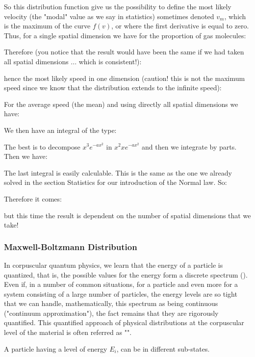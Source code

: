 	So this distribution function give us the possibility to define the most likely velocity (the "modal" value as we say in statistics) sometimes denoted $v_m$, which is the maximum of the curve $f (v)$, or where the first derivative is equal to zero. Thus, for a single spatial dimension we have for the proportion of gas molecules:
	
	Therefore (you notice that the result would have been the same if we had taken all spatial dimensions ... which is consistent!):
	
	hence the most likely speed in one dimension (caution! this is not the maximum speed since we know that the distribution extends to the infinite speed):
	
	For the average speed (the mean) and using directly all spatial dimensions we have:
	
	We then have an integral of the type:
	
	The best is to decompose $x^3e^{-ax^2}$ in $x^2xe^{-ax^2}$ and then we integrate by parts. Then we have:
	
	The last integral is easily calculable. This is the same as the one we already solved in the section Statistics for our introduction of the Normal law. So:
	
	Therefore it comes:
	
	but this time the result is dependent on the number of spatial dimensions that we take!
	
	\subsubsection{Maxwell-Boltzmann Distribution}
	In corpuscular quantum physics, we learn that the energy of a particle is quantized, that is, the possible values for the energy form a discrete spectrum (). Even if, in a number of common situations, for a particle and even more for a system consisting of a large number of particles, the energy levels are so tight that we can handle, mathematically, this spectrum as being continuous ("continuum approximation"), the fact remains that they are rigorously quantified. This quantified approach of physical distributions at the corpuscular level of the material is often referred as "".
	
	A particle having a level of energy $E_i$, can be in different sub-states.

